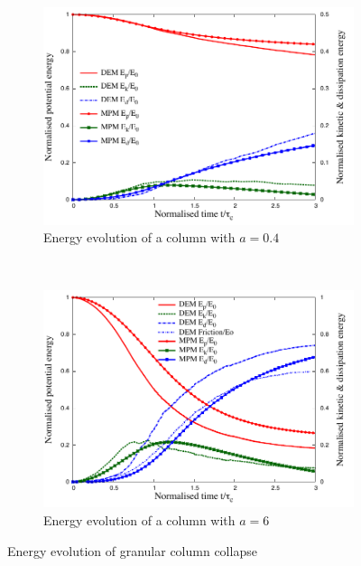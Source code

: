 \begin{figure}[tbhp]
\centering
\begin{subfigure}[b]{0.975\textwidth}
\includegraphics[width=\textwidth]{a04_energy}
\caption{Energy evolution of a column with $a=0.4$}
\label{fig:a04_energy}
\end{subfigure}
\\
\begin{subfigure}[b]{0.975\textwidth}
\centering
\includegraphics[width=\textwidth]{a6_energy}
\caption{Energy evolution of a column with $a=6$}
\label{fig:a6_energy}
\end{subfigure}
\caption{Energy evolution of granular column collapse}
\label{fig:column_energy}
\end{figure}

